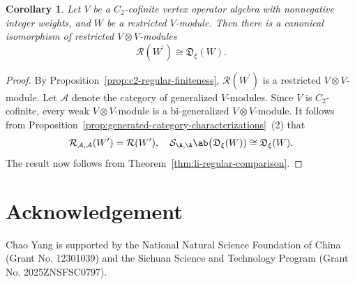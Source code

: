 \documentclass[12pt, english]{article}
\numberwithin{equation}{section}
\theoremstyle{plain}
\newtheorem{corollary}[lemma]{Corollary}
\theoremstyle{definition}
\theoremstyle{remark}
\begin{document}
	\begin{corollary}
		Let $V$ be a $C_2$-cofinite vertex operator algebra with nonnegative integer weights, and $W$ be a restricted $V$-module.
		Then there is a canonical isomorphism of restricted $V \otimes V$-modules
		\[
		\mathcal{R}(W^\prime) \cong \mathfrak{D}_{\xi}(W).
		\]
		
	\end{corollary}
	
	\begin{proof}
		By Proposition~\ref{prop:c2-regular-finiteness}, $\mathcal{R}(W^\prime)$ is a  restricted $V \otimes V$-module.
		Let $\mathcal{A}$ denote the category of generalized $V$-modules.
		Since $V$ is $C_2$-cofinite,  every weak $V \otimes V$-module is a bi-generalized $V \otimes V$-module.
		It follows from Proposition~\ref{prop:generated-category-characterizations}~(2) that
		\[
		\mathcal{R}_{\mathcal{A}, \mathcal{A}}(W^\prime) = \mathcal{R}(W^\prime), \quad \mathcal{S}_{\A, \A} \ab\big(\mathfrak{D}_{\xi}(W)) \cong \mathfrak{D}_{\xi}(W).
		\]
		The result now follows from Theorem~\ref{thm:li-regular-comparison}.
	\end{proof}
	
	
	
	\section*{Acknowledgement}
	
	Chao Yang is supported by the National Natural Science Foundation of China (Grant No. 12301039) and the Sichuan Science and Technology Program (Grant No. 2025ZNSFSC0797).
	
	
	
	
	
	
\end{document}
